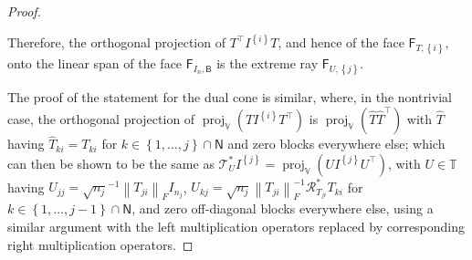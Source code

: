 \documentclass[10pt,a4paper]{amsart}
\DeclareMathOperator{\proj}{proj}
\begin{document}
\begin{proof}
\begin{enumerate}[label=(\roman*)]
\end{enumerate}
Therefore, the orthogonal projection of $T^{\top} I^{\left\{i\right\}} T$,
and hence of the face $\mathsf{F}_{T,\left\{i\right\}}$, onto the linear
span of the face $\mathsf{F}_{I_{n},\mathsf{B}}$ is the extreme ray
$\mathsf{F}_{U,\left\{j\right\}}$.

The proof of the statement for the dual cone is similar, where, in the
nontrivial case, the orthogonal projection of $\proj_{\mathbb{V}}\left( T
I^{\left\{i\right\}} T^{\top} \right)$ is $\proj_{\mathbb{V}}\left( \hat{T}
\hat{T}^{\top} \right)$ with $\hat{T}$ having $\hat{T}_{ki} = T_{ki}$ for
$k \in \left\{1, \dotsc, j\right\} \cap \mathsf{N}$ and zero blocks
everywhere else; which can then be shown to be the same as
$\mathcal{T}^{*}_{U} I^{\left\{j\right\}} = \proj_{\mathbb{V}}\left( U
I^{\left\{j\right\}} U^{\top} \right)$, with $U \in \mathbb{T}$ having
$U_{jj} = \sqrt{n_{j}}^{-1} \left\lVert T_{ji}\right\rVert_{F} I_{n_{j}}$,
$U_{kj} = \sqrt{n_{j}} \left\lVert T_{ji}\right\rVert_{F}^{-1}
\mathcal{R}^{*}_{T_{ji}} T_{ki}$ for $k \in \left\{1, \dotsc, j-1\right\}
\cap \mathsf{N}$, and zero off-diagonal blocks everywhere else, using a
similar argument with the left multiplication operators replaced by
corresponding right multiplication operators.
\end{proof}
\end{document}
